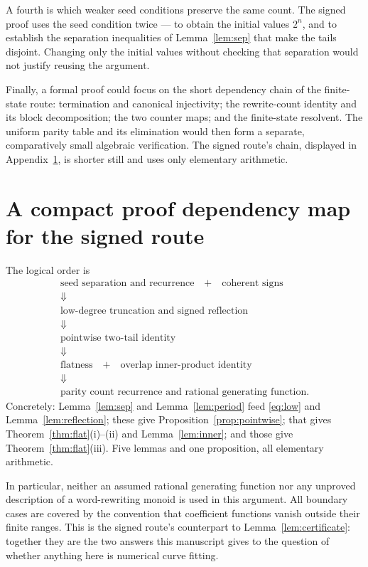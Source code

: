 \documentclass[11pt,letterpaper]{article}
\numberwithin{equation}{section}
\theoremstyle{definition}
\theoremstyle{remark}
\begin{document}
A fourth is which weaker seed conditions preserve the same count. The
signed proof uses the seed condition twice --- to obtain the initial values
$2^n$, and to establish the separation inequalities of Lemma~\ref{lem:sep}
that make the tails disjoint. Changing only the initial values without
checking that separation would not justify reusing the argument.

Finally, a formal proof could focus on the short dependency chain of the
finite-state route: termination and canonical injectivity; the rewrite-count
identity and its block decomposition; the two counter maps; and the
finite-state resolvent. The uniform parity table and its elimination would
then form a separate, comparatively small algebraic verification. The signed
route's chain, displayed in Appendix~\ref{app:dependency}, is shorter still
and uses only elementary arithmetic.

\appendix
\section{A compact proof dependency map for the signed route}
\label{app:dependency}

The logical order is
\[
\begin{gathered}
\text{seed separation and recurrence}\quad+\quad\text{coherent signs}\\
\Downarrow\\
\text{low-degree truncation and signed reflection}\\
\Downarrow\\
\text{pointwise two-tail identity}\\
\Downarrow\\
\text{flatness}\quad+\quad\text{overlap inner-product identity}\\
\Downarrow\\
\text{parity count recurrence and rational generating function}.
\end{gathered}
\]
Concretely: Lemma~\ref{lem:sep} and Lemma~\ref{lem:period} feed
\eqref{eq:low} and Lemma~\ref{lem:reflection}; these give
Proposition~\ref{prop:pointwise}; that gives Theorem~\ref{thm:flat}(i)--(ii)
and Lemma~\ref{lem:inner}; and those give Theorem~\ref{thm:flat}(iii).
Five lemmas and one proposition, all elementary arithmetic.

In particular, neither an assumed rational generating function nor any
unproved description of a word-rewriting monoid is used in this argument.
All boundary cases are covered by the convention that coefficient functions
vanish outside their finite ranges. This is the signed route's counterpart
to Lemma~\ref{lem:certificate}: together they are the two answers this
manuscript gives to the question of whether anything here is numerical
curve fitting.
\end{document}
